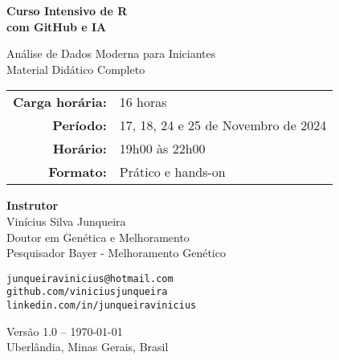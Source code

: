 \documentclass[12pt,a4paper]{article}
\begin{document}
\begin{titlepage}
  \thispagestyle{empty}
  \centering


  \vspace*{2cm}

  {\Huge\bfseries Curso Intensivo de R\\[0.3cm]
  com GitHub e IA\\[1.5cm]}

  {\Large Análise de Dados Moderna para Iniciantes\\[0.5cm]
  Material Didático Completo\\[2cm]}

  \begin{tabular}{rl}
    \textbf{Carga horária:} & 16 horas \\[0.2cm]
    \textbf{Período:} & 17, 18, 24 e 25 de Novembro de 2024 \\[0.2cm]
    \textbf{Horário:} & 19h00 às 22h00 \\[0.2cm]
    \textbf{Formato:} & Prático e hands-on \\[0.2cm]
  \end{tabular}

  \vfill

  {\large
  \textbf{Instrutor}\\[0.3cm]
  Vinícius Silva Junqueira\\[0.2cm]
  \small
  Doutor em Genética e Melhoramento\\
  Pesquisador Bayer - Melhoramento Genético\\[0.5cm]
  }

  {\footnotesize
  \texttt{junqueiravinicius@hotmail.com}\\
  \texttt{github.com/viniciusjunqueira}\\
  \texttt{linkedin.com/in/junqueiravinicius}\\[1cm]
  }

  {\small
  Versão 1.0 -- \today\\
  Uberlândia, Minas Gerais, Brasil
  }

\end{titlepage}
\end{document}
